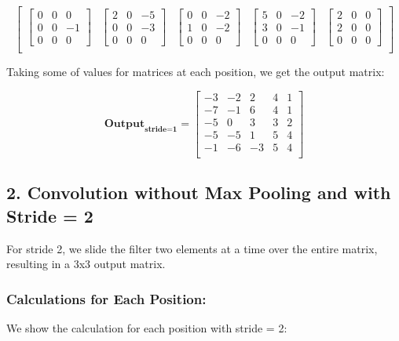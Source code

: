 \documentclass{article}
\begin{document}
\[\begin{bmatrix}
    \begin{bmatrix} 0 & 0 & 0 \\ 0 & 0 & -1 \\ 0 & 0 & 0 \end{bmatrix} &
    \begin{bmatrix} 2 & 0 & -5 \\ 0 & 0 & -3 \\ 0 & 0 & 0 \end{bmatrix} &
    \begin{bmatrix} 0 & 0 & -2 \\ 1 & 0 & -2 \\ 0 & 0 & 0 \end{bmatrix} &
    \begin{bmatrix} 5 & 0 & -2 \\ 3 & 0 & -1 \\ 0 & 0 & 0 \end{bmatrix} &
    \begin{bmatrix} 2 & 0 & 0 \\ 2 & 0 & 0 \\ 0 & 0 & 0 \end{bmatrix}   \\
  \end{bmatrix}
\]

Taking some of values for matrices at each position, we get the output matrix:

\[
  \textbf{Output}_{\textbf{stride=1}} =
  \begin{bmatrix}
    -3 & -2 & 2  & 4 & 1 \\
    -7 & -1 & 6  & 4 & 1 \\
    -5 & 0  & 3  & 3 & 2 \\
    -5 & -5 & 1  & 5 & 4 \\
    -1 & -6 & -3 & 5 & 4 \\
  \end{bmatrix}
\]

\subsection*{2. Convolution without Max Pooling and with Stride = 2}

For stride 2, we slide the filter two elements at a time over the entire matrix, resulting in a 3x3 output matrix.

\subsubsection*{Calculations for Each Position:}
We show the calculation for each position with stride = 2:
\end{document}
